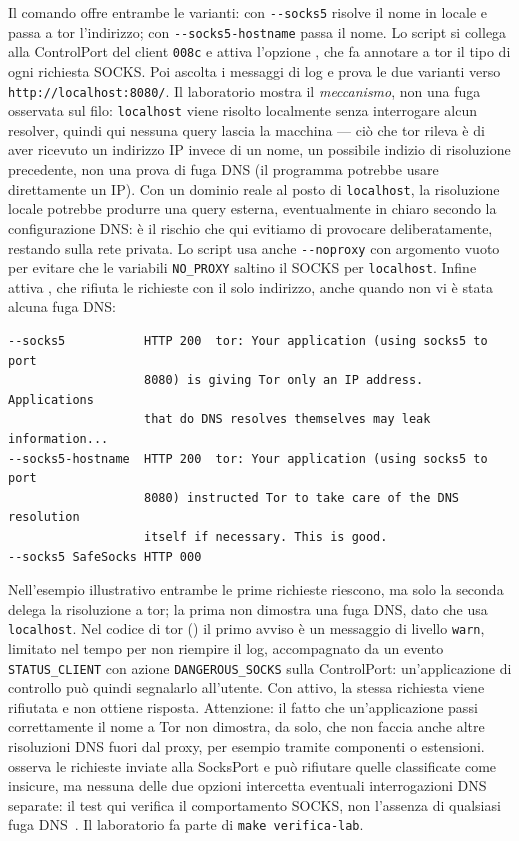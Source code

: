 Il comando  offre entrambe le varianti: con \texttt{-{}-socks5} risolve il nome in locale e passa a tor l'indirizzo; con \texttt{-{}-socks5-hostname} passa il nome. Lo script  si collega alla ControlPort del client \texttt{008c} e attiva l'opzione , che fa annotare a tor il tipo di ogni richiesta SOCKS. Poi ascolta i messaggi di log e prova le due varianti verso \texttt{http://localhost:8080/}. Il laboratorio mostra il \emph{meccanismo}, non una fuga osservata sul filo: \texttt{localhost} viene risolto localmente senza interrogare alcun resolver, quindi qui nessuna query lascia la macchina — ciò che tor rileva è di aver ricevuto un indirizzo IP invece di un nome, un possibile indizio di risoluzione precedente, non una prova di fuga DNS (il programma potrebbe usare direttamente un IP). Con un dominio reale al posto di \texttt{localhost}, la risoluzione locale potrebbe produrre una query esterna, eventualmente in chiaro secondo la configurazione DNS: è il rischio che qui evitiamo di provocare deliberatamente, restando sulla rete privata. Lo script usa anche \texttt{-{}-noproxy} con argomento vuoto per evitare che le variabili \texttt{NO\_PROXY} saltino il SOCKS per \texttt{localhost}. Infine attiva , che rifiuta le richieste con il solo indirizzo, anche quando non vi è stata alcuna fuga DNS:
\begin{lstlisting}[numbers=none]
--socks5           HTTP 200  tor: Your application (using socks5 to port
                   8080) is giving Tor only an IP address. Applications
                   that do DNS resolves themselves may leak information...
--socks5-hostname  HTTP 200  tor: Your application (using socks5 to port
                   8080) instructed Tor to take care of the DNS resolution
                   itself if necessary. This is good.
--socks5 SafeSocks HTTP 000
\end{lstlisting}
Nell'esempio illustrativo entrambe le prime richieste riescono, ma solo la seconda delega la risoluzione a tor; la prima non dimostra una fuga DNS, dato che usa \texttt{localhost}. Nel codice di tor () il primo avviso è un messaggio di livello \texttt{warn}, limitato nel tempo per non riempire il log, accompagnato da un evento \texttt{STATUS\_CLIENT} con azione \texttt{DANGEROUS\_SOCKS} sulla ControlPort: un'applicazione di controllo può quindi segnalarlo all'utente. Con  attivo, la stessa richiesta viene rifiutata e  non ottiene risposta. Attenzione: il fatto che un'applicazione passi correttamente il nome a Tor non dimostra, da solo, che non faccia anche altre risoluzioni DNS fuori dal proxy, per esempio tramite componenti o estensioni.  osserva le richieste inviate alla SocksPort e  può rifiutare quelle classificate come insicure, ma nessuna delle due opzioni intercetta eventuali interrogazioni DNS separate: il test qui verifica il comportamento SOCKS, non l'assenza di qualsiasi fuga DNS~\cite{torsocksleaks}. Il laboratorio fa parte di \texttt{make verifica-lab}.


